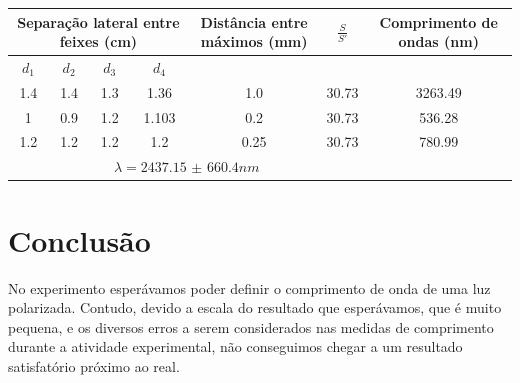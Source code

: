 \documentclass[
12pt,				%
openright,			%
oneside,			%
a4paper,			%
english,			%
french,				%
spanish,			%
brazil,				%
]{abntex2}
\begin{document}
\begin{table}[!htb]
  {%
    \begin{tabular}{ccccccc}
      \toprule
      \multicolumn{4}{c}{Separação lateral entre feixes (cm)} & Distância entre máximos (mm) & $\frac{S}{S'}$ & Comprimento de ondas (nm) \\
      \midrule \midrule
      $d_{1}$ & $d_{2}$ & $d_{3}$& $ d_{4} $ & ~ & ~ &  ~\\
      \hline
      1.4 & 1.4 & 1.3 & 1.36 & 1.0 & 30.73 & 3263.49 \\
      \hline
      1 & 0.9 & 1.2 & 1.103 & 0.2& 30.73 & 536.28 \\
      \hline
      1.2& 1.2& 1.2  & 1.2 & 0.25& 30.73 & 780.99 \\
      \hline
      \multicolumn{6}{c}{$ \lambda = 2437.15$ $\pm$ $660.4 nm $}\\

      \bottomrule
    \end{tabular}%
  }
  {%
  }
\end{table}


\clearpage

\chapter{Conclusão}

No experimento esperávamos poder definir o comprimento de onda de uma luz polarizada. Contudo, devido a escala do resultado que esperávamos, que é muito pequena, e os diversos erros a serem considerados nas medidas de comprimento durante a atividade experimental, não conseguimos chegar a um resultado satisfatório próximo ao real.

\clearpage


\end{document}
